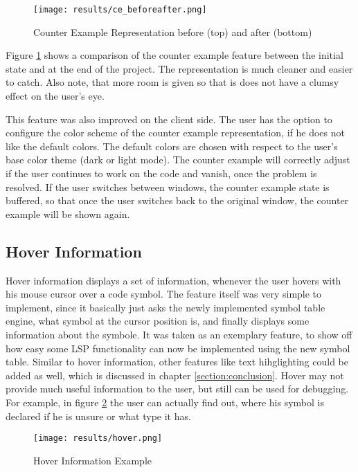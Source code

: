 \begin{figure}[h]
    \centering
    \texttt{[image: results/ce\_beforeafter.png]}
    \caption{Counter Example Representation before (top) and after (bottom)}
    \label{fig:ce_beforeafter}
\end{figure}

Figure \ref{fig:ce_beforeafter} shows a comparison of the counter example feature between the initial state and at the end of the project.
The representation is much cleaner and easier to catch.
Also note, that more room is given so that is does not have a clumsy effect on the user's eye. 

This feature was also improved on the client side.
The user has the option to configure the color scheme of the counter example representation, if he does not like the default colors.
The default colors are chosen with respect to the user's base color theme (dark or light mode).
The counter example will correctly adjust if the user continues to work on the code and vanish, once the problem is resolved.
If the user switches between windows, the counter example state is buffered, so that once the user switches back to the original window, the counter example will be shown again.



\subsection{Hover Information}
Hover information displays a set of information, whenever the user hovers with his mouse cursor over a code symbol.
The feature itself was very simple to implement, since it basically just asks the newly implemented symbol table engine, what symbol at the cursor position is, and finally displays some information about the symbole.
It was taken as an exemplary feature, to show off how easy some LSP functionality can now be implemented using the new symbol table.
Similar to hover information, other features like text hihglighting could be added as well, which is discussed in chapter \ref{section:conclusion}.
Hover may not provide much useful information to the user, but still can be used for debugging.
For example, in figure \ref{fig:hover} the user can actually find out, where his symbol  is declared if he is unsure or what type it has.

\begin{figure}[h]
    \centering
    \texttt{[image: results/hover.png]}
    \caption{Hover Information Example}
    \label{fig:hover}
\end{figure}

